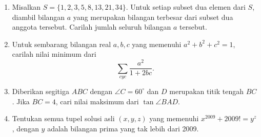 \documentclass[12pt]{scrartcl}
\begin{document}
\begin{enumerate}[resume]
		\item Misalkan  $S = \{1,2,3,5,8,13,21,34\}$. Untuk setiap subset dua elemen dari $S$, diambil bilangan $a$ yang merupakan bilangan terbesar dari subset dua anggota tersebut. Carilah jumlah seluruh bilangan $a$ tersebut.
	
		\item Untuk sembarang bilangan real $a,b,c$ yang memenuhi $a^2+b^2+c^2=1$, carilah nilai minimum dari $$\sum_{cyc}^{} \frac{a^2}{1+2bc}.$$
		
		\item Diberikan segitiga $ABC$ dengan $\angle C = 60^\circ$ dan $D$ merupakan titik tengah $BC$. Jika $BC=4$, cari nilai maksimum dari $\tan \angle BAD$.
		
		\item Tentukan semua tupel solusi asli $(x,y,z)$ yang memenuhi $x^{2009}+2009!=y^z$, dengan $y$ adalah bilangan prima yang tak lebih dari 2009.

\end{enumerate}
\end{document}
